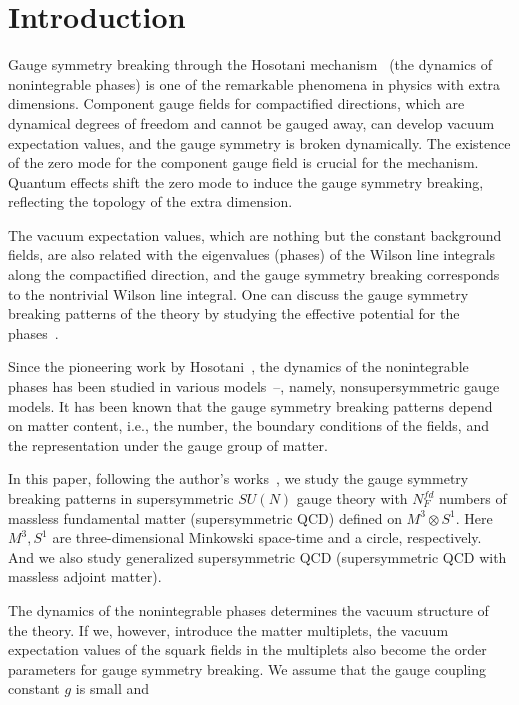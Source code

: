 \documentclass[a4paper,12pt]{article}
\begin{document}
\section{Introduction}
Gauge symmetry breaking through the Hosotani 
mechanism~\cite{hosotani, hosotanib} (the dynamics of nonintegrable 
phases) is one of the 
remarkable phenomena in physics with extra 
dimensions. 
Component gauge fields for compactified 
directions, which are dynamical degrees of freedom and cannot be gauged 
away, can develop vacuum expectation values, and the gauge symmetry
is broken dynamically.
The existence of the zero mode for the component gauge
field is crucial for the mechanism. Quantum effects shift the zero mode
to induce the gauge symmetry breaking, reflecting the topology of the
extra dimension. 
\par
The vacuum expectation values, which are 
nothing but the constant background fields, are also related with the 
eigenvalues (phases) of the Wilson line 
integrals along the compactified direction, and 
the gauge symmetry breaking corresponds to 
the nontrivial Wilson line integral.
One can discuss the gauge symmetry breaking patterns of the theory
by studying the effective potential for the phases~\cite{hosotanib}.
\par
Since the pioneering work by Hosotani~\cite{hosotani}, the 
dynamics of the nonintegrable
phases has been studied in various 
models~\cite{hosotanib}--\cite{inte}, namely, nonsupersymmetric 
gauge models. It has been known that the gauge 
symmetry breaking patterns depend 
on matter content, i.e., the number, the boundary conditions of the 
fields, and the representation under the gauge group of matter. 
\par
In this paper, following the author's works~\cite{takenaga, takenagab}, we 
study the gauge symmetry breaking patterns in  
supersymmetric $SU(N)$ gauge theory with $N_F^{fd}$ numbers of massless
fundamental matter (supersymmetric QCD) defined on $M^3\otimes S^1$.
Here $M^3, S^1$ are three-dimensional Minkowski space-time and a 
circle, respectively. And we also study  
generalized supersymmetric QCD
(supersymmetric QCD with massless adjoint matter). 
\par
The dynamics of the nonintegrable phases determines the vacuum structure 
of the theory. If we, however, introduce the matter multiplets, the 
vacuum expectation values of the squark fields
in the multiplets also become the order parameters for gauge symmetry 
breaking. We assume that the gauge coupling constant $g$ is small and 
\end{document}
